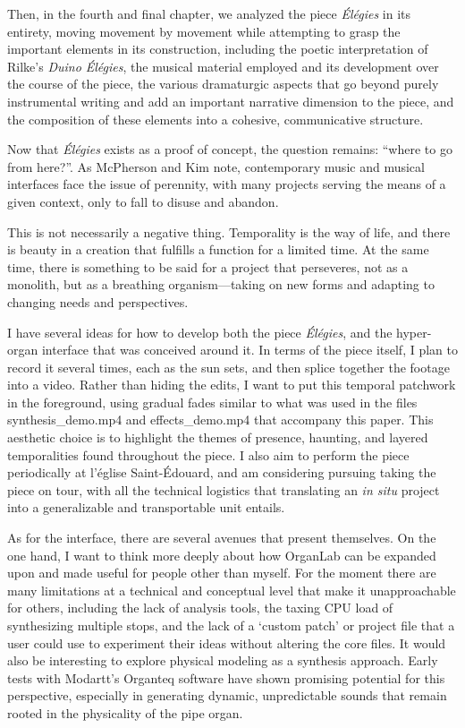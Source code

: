 \documentclass[12pt,twoside,maitrise]{dms_ks}
\theoremstyle{definition}
\begin{document}
{Then, in the fourth and final chapter, we analyzed the piece \textit{Élégies} in its entirety, moving movement by movement while attempting to grasp the important elements in its construction, including the poetic interpretation of Rilke's \textit{Duino Élégies}, the musical material employed and its development over the course of the piece, the various dramaturgic aspects that go beyond purely instrumental writing and add an important narrative dimension to the piece, and the composition of these elements into a cohesive, communicative structure. 

Now that \textit{Élégies} exists as a proof of concept, the question remains: “where to go from here?”.
As McPherson and Kim note, contemporary music and musical interfaces face the issue of perennity, with many projects serving the means of a given context, only to fall to disuse and abandon. 

This is not necessarily a negative thing.
Temporality is the way of life, and there is beauty in a creation that fulfills a function for a limited time.
At the same time, there is something to be said for a project that perseveres, not as a monolith, but as a breathing organism---taking on new forms and adapting to changing needs and perspectives.   

I have several ideas for how to develop both the piece \textit{Élégies}, and the hyper-organ interface that was conceived around it. 
In terms of the piece itself, I plan to record it several times, each as the sun sets, and then splice together the footage into a video.
Rather than hiding the edits, I want to put this temporal patchwork in the foreground, using gradual fades similar to what was used in the files synthesis\_demo.mp4 and effects\_demo.mp4 that accompany this paper.
This aesthetic choice is to highlight the themes of presence, haunting, and layered temporalities found throughout the piece.
I also aim to perform the piece periodically at l'église Saint-Édouard, and am considering pursuing taking the piece on tour, with all the technical logistics that translating an \textit{in situ} project into a generalizable and transportable unit entails.

As for the interface, there are several avenues that present themselves. 
On the one hand, I want to think more deeply about how OrganLab can be expanded upon and made useful for people other than myself. 
For the moment there are many limitations at a technical and conceptual level that make it unapproachable for others, including the lack of analysis tools, the taxing CPU load of synthesizing multiple stops, and the lack of a `custom patch' or project file that a user could use to experiment their ideas without altering the core files. 
It would also be interesting to explore physical modeling as a synthesis approach.
Early tests with Modartt's Organteq software have shown promising potential for this perspective, especially in generating dynamic, unpredictable sounds that remain rooted in the physicality of the pipe organ.

}
\end{document}
